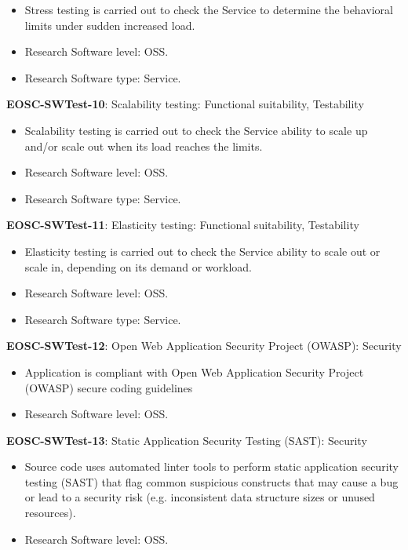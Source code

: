 \begin{itemize}
    \item Stress testing is carried out to check the Service to determine the behavioral limits under sudden increased load. \cite{orviz_fernandez_eosc-synergy_2020}
    \item Research Software level: OSS.
    \item Research Software type: Service.
\end{itemize}

\textbf{EOSC-SWTest-10}: Scalability testing: Functional suitability, Testability

\begin{itemize}
    \item Scalability testing is carried out to check the Service ability to scale up and/or scale out when its load reaches the limits. \cite{orviz_fernandez_eosc-synergy_2020}
    \item Research Software level: OSS.
    \item Research Software type: Service.
\end{itemize}

\textbf{EOSC-SWTest-11}: Elasticity testing: Functional suitability, Testability

\begin{itemize}
    \item Elasticity testing is carried out to check the Service ability to scale out or scale in, depending on its demand or workload. \cite{orviz_fernandez_eosc-synergy_2020}
    \item Research Software level: OSS.
    \item Research Software type: Service.
\end{itemize}

\textbf{EOSC-SWTest-12}: Open Web Application Security Project (OWASP): Security

\begin{itemize}
    \item Application is compliant with Open Web Application Security Project (OWASP) secure coding guidelines \cite{orviz_set_2017}
    \item Research Software level: OSS.
\end{itemize}

\textbf{EOSC-SWTest-13}: Static Application Security Testing (SAST): Security

\begin{itemize}
    \item Source code uses automated linter tools to perform static application security testing (SAST) that flag common suspicious constructs that may cause a bug or lead to a security risk (e.g. inconsistent data structure sizes or unused resources). \cite{orviz_set_2017}
    \item Research Software level: OSS.
\end{itemize}

